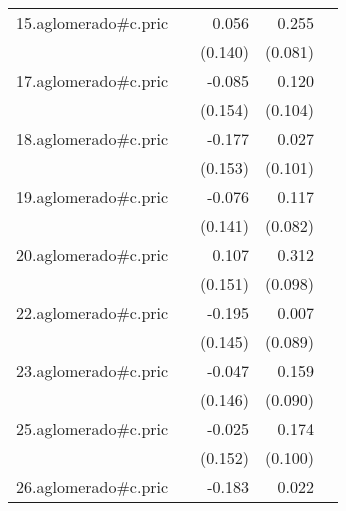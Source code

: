{\begin{longtable}{l*{4}{D{.}{.}{-1}}}
\addlinespace
15.aglomerado#c.pric&                     &       0.056         &       0.255\sym{**} &                     \\
            &                     &     (0.140)         &     (0.081)         &                     \\
\addlinespace
17.aglomerado#c.pric&                     &      -0.085         &       0.120         &                     \\
            &                     &     (0.154)         &     (0.104)         &                     \\
\addlinespace
18.aglomerado#c.pric&                     &      -0.177         &       0.027         &                     \\
            &                     &     (0.153)         &     (0.101)         &                     \\
\addlinespace
19.aglomerado#c.pric&                     &      -0.076         &       0.117         &                     \\
            &                     &     (0.141)         &     (0.082)         &                     \\
\addlinespace
20.aglomerado#c.pric&                     &       0.107         &       0.312\sym{**} &                     \\
            &                     &     (0.151)         &     (0.098)         &                     \\
\addlinespace
22.aglomerado#c.pric&                     &      -0.195         &       0.007         &                     \\
            &                     &     (0.145)         &     (0.089)         &                     \\
\addlinespace
23.aglomerado#c.pric&                     &      -0.047         &       0.159         &                     \\
            &                     &     (0.146)         &     (0.090)         &                     \\
\addlinespace
25.aglomerado#c.pric&                     &      -0.025         &       0.174         &                     \\
            &                     &     (0.152)         &     (0.100)         &                     \\
\addlinespace
26.aglomerado#c.pric&                     &      -0.183         &       0.022         &                     \\

\end{longtable}}
